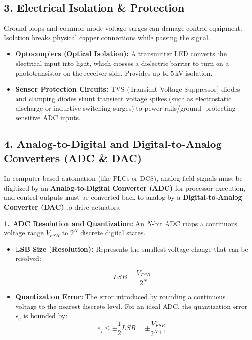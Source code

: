 \documentclass[12pt,a4paper]{article}
\begin{document}
\subsection{3. Electrical Isolation \& Protection}
Ground loops and common-mode voltage surges can damage control equipment. Isolation breaks physical copper connections while passing the signal.
\begin{itemize}[leftmargin=*, itemsep=2.5pt]
  \item \textbf{Optocouplers (Optical Isolation):} A transmitter LED converts the electrical input into light, which crosses a dielectric barrier to turn on a phototransistor on the receiver side. Provides up to $5\,$kV isolation.
  \item \textbf{Sensor Protection Circuits:} TVS (Transient Voltage Suppressor) diodes and clamping diodes shunt transient voltage spikes (such as electrostatic discharge or inductive switching surges) to power rails/ground, protecting sensitive ADC inputs.
\end{itemize}

\subsection{4. Analog-to-Digital and Digital-to-Analog Converters (ADC \& DAC)}
In computer-based automation (like PLCs or DCS), analog field signals must be digitized by an \textbf{Analog-to-Digital Converter (ADC)} for processor execution, and control outputs must be converted back to analog by a \textbf{Digital-to-Analog Converter (DAC)} to drive actuators.

\textbf{1. ADC Resolution and Quantization:}
An $N$-bit ADC maps a continuous voltage range $V_{FSR}$ to $2^N$ discrete digital states.
\begin{itemize}[leftmargin=*, itemsep=2pt]
  \item \textbf{LSB Size (Resolution):} Represents the smallest voltage change that can be resolved:
  \begin{tcolorbox}[formulabox, title={\textbf{ADC LSB Resolution}}]
  \[
  LSB = \frac{V_{FSR}}{2^N}
  \]
  \end{tcolorbox}
  \item \textbf{Quantization Error:} The error introduced by rounding a continuous voltage to the nearest discrete level. For an ideal ADC, the quantization error $e_q$ is bounded by:
  \[
  e_q \le \pm \frac{1}{2} LSB = \pm \frac{V_{FSR}}{2^{N+1}}
  \]
\end{itemize}
\end{document}
